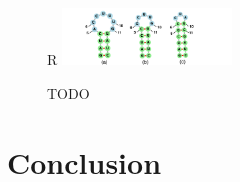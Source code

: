 \documentclass{article}
\begin{document}
\begin{figure}{R}
    \centering
    \includegraphics[width=0.4\textwidth]{plot/gradient_ascent.pdf}
    \caption{TODO}
    \label{fig:gradient_ascent}
    \centering
\end{figure}



\section{Conclusion}

%
%
%



\clearpage




%
%
%
\end{document}

